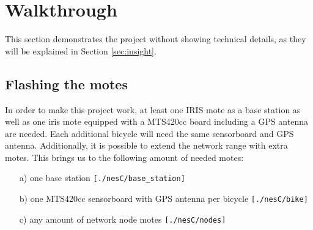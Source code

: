 \documentclass[a4paper]{article}
\newcommand{\mts}{MTS420cc }
\begin{document}
\section{Walkthrough}\label{sec:walkthrough}
This section demonstrates the project without showing technical details, as they will be explained in Section \ref{sec:insight}. 
\subsection{Flashing the motes}
In order to make this project work, at least one IRIS mote as a base station as well as one iris mote equipped with a \mts board including a GPS antenna are needed. Each additional bicycle will need the same sensorboard and GPS antenna. Additionally, it is possible to extend the network range with extra motes. This brings us to the following amount of needed motes:
\begin{enumerate}
\item[a)] one base station \texttt{[./nesC/base\_station]}
\item[b)] one \mts sensorboard with GPS antenna per bicycle \texttt{[./nesC/bike]}
\item[c)] any amount of network node motes \texttt{[./nesC/nodes]}
\end{enumerate}
\end{document}
